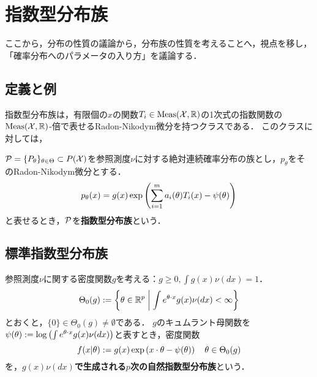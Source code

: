 \documentclass[uplatex,dvipdfmx]{jsreport}
\begin{document}
\section{指数型分布族}

\begin{tcolorbox}[colframe=ForestGreen, colback=ForestGreen!10!white,breakable,colbacktitle=ForestGreen!40!white,coltitle=black,fonttitle=\bfseries\sffamily,
title=]
    ここから，分布の性質の議論から，分布族の性質を考えることへ，視点を移し，「確率分布へのパラメータの入り方」を議論する．
\end{tcolorbox}

\subsection{定義と例}

\begin{tcolorbox}[colframe=ForestGreen, colback=ForestGreen!10!white,breakable,colbacktitle=ForestGreen!40!white,coltitle=black,fonttitle=\bfseries\sffamily,
title=]
    指数型分布族は，有限個の$x$の関数$T_i\in\Meas(\X,\R)$の1次式の指数関数の$\Meas(\X,\R)$-倍で表せるRadon-Nikodym微分を持つクラスである．
    このクラスに対しては，
\end{tcolorbox}

\begin{definition}
    $\P=\{P_\theta\}_{\theta\in\Theta}\subset P(\X)$を参照測度$\nu$に対する絶対連続確率分布の族とし，$p_\theta$をそのRadon-Nikodym微分とする．
    \[p_\theta(x)=g(x)\exp\paren{\sum^m_{i=1}a_i(\theta)T_i(x)-\psi(\theta)}\]
    と表せるとき，$\P$を\textbf{指数型分布族}という．
\end{definition}

\subsection{標準指数型分布族}

\begin{definition}[密度関数による指数型分布族の生成]
    参照測度$\nu$に関する密度関数$g$を考える：$g\ge0,\int g(x)\nu(dx)=1$．
    \[\Theta_0(g):=\Brace{\theta\in\R^p\;\middle|\;\int e^{\theta\cdot x}g(x)\nu(dx)<\infty}\]
    とおくと，$\{0\}\in\Theta_0(g)\ne\emptyset$である．
    $g$のキュムラント母関数を$\psi(\theta):=\log\paren{\int e^{\theta\cdot x}g(x)\nu(dx)}$と表すとき，密度関数
    \[f(x|\theta):=g(x)\exp\paren{x\cdot\theta-\psi(\theta)}\quad\theta\in\Theta_0(g)\]
    を，\textbf{$g(x)\nu(dx)$で生成される$p$次の自然指数型分布族}という．
\end{definition}
\end{document}
